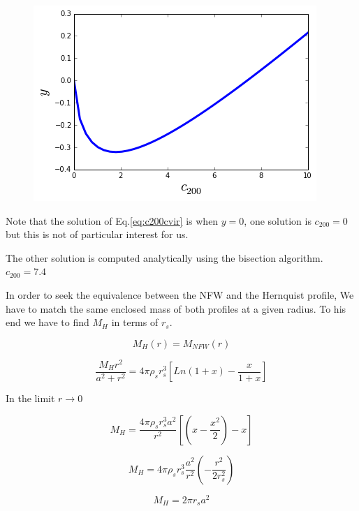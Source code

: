 \documentclass[a4paper, 12pt]{article} %
\begin{document}
\begin{figure}[H]\label{fig:c200cvir}
\centering
\includegraphics[scale=0.7]{c200cvir.png}
\end{figure}

Note that the solution of Eq.\ref{eq:c200cvir} is when $y=0$, one 
solution is $c_{200}=0$ but this is not of particular interest for us. 

The other solution is computed analytically using the bisection algorithm.
$c_{200} = 7.4$

In order to seek the equivalence between the NFW and the Hernquist profile, 
We have to match the same enclosed mass of both profiles at a given radius.
To his end we have to find $M_H$ in terms of $r_s$. 

\begin{equation}
M_H(r) = M_{NFW}(r)
\end{equation}

\begin{equation}
\frac{M_H r^2}{a^2 + r^2} = 4 \pi \rho_s r_s^3 \left[ Ln(1 + x) - \frac{x}{1+x}  \right]
\end{equation}

In the limit $r \rightarrow 0$ 

\begin{equation}
M_H = \dfrac{4 \pi \rho_s r_s^3 a^2}{r^2} \left[ (x - \dfrac{x^2}{2}) - x  \right]
\end{equation}

\begin{equation}
M_H = 4 \pi \rho_s r_s^3 \dfrac{a^2}{r^2} \left(  - \dfrac{r^2}{2r_s^2} \right)
\end{equation}

\begin{equation}
M_H = 2 \pi r_s a^2
\end{equation}
 
\end{document}
